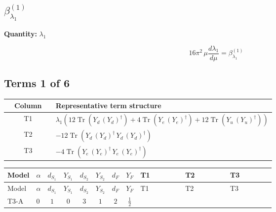\documentclass[8pt]{article}
\begin{document}
\begin{landscape}
\section*{$\beta_{\lambda_1}^{(1)}$}
\noindent\textbf{Quantity: }$\lambda_1$\par\smallskip
\[16\pi^2\,\mu\frac{d \lambda_1}{d\mu}=\beta_{\lambda_1}^{(1)}\]
\subsection*{Terms 1 of 6}
\begin{center}
\begin{tabular}{@{}c >{\raggedright\arraybackslash}p{0.82\linewidth}@{}}
\toprule
Column & Representative term structure \\
\midrule
T1 & \(\displaystyle {\lambda_1} (12 \operatorname{Tr}\!\left({Y_d}\,\left({Y_d}\right)^{\dagger}\right)+4 \operatorname{Tr}\!\left({Y_e}\,\left({Y_e}\right)^{\dagger}\right)+12 \operatorname{Tr}\!\left({Y_u}\,\left({Y_u}\right)^{\dagger}\right))\) \\
\midrule
T2 & \(\displaystyle -12 \operatorname{Tr}\!\left({Y_d}\,\left({Y_d}\right)^{\dagger}\,{Y_d}\,\left({Y_d}\right)^{\dagger}\right)\) \\
\midrule
T3 & \(\displaystyle -4 \operatorname{Tr}\!\left({Y_e}\,\left({Y_e}\right)^{\dagger}\,{Y_e}\,\left({Y_e}\right)^{\dagger}\right)\) \\
\midrule
\bottomrule
\end{tabular}
\end{center}
\smallskip
\tiny
\begin{longtable}{@{}llcccccc >{\raggedright\arraybackslash}p{0.21\linewidth} >{\raggedright\arraybackslash}p{0.21\linewidth} >{\raggedright\arraybackslash}p{0.21\linewidth}@{}}
\toprule
Model & $\alpha$ & $d_{S_1}$ & $Y_{S_1}$ & $d_{S_2}$ & $Y_{S_2}$ & $d_F$ & $Y_F$ & T1 & T2 & T3 \\
\midrule
\endfirsthead
\toprule
Model & $\alpha$ & $d_{S_1}$ & $Y_{S_1}$ & $d_{S_2}$ & $Y_{S_2}$ & $d_F$ & $Y_F$ & T1 & T2 & T3 \\
\midrule
\endhead
T3-A & $0$ & $1$ & $0$ & $3$ & $1$ & $2$ & $\frac{1}{2}$ & \scriptsize\adjustbox{max width=\linewidth}{$\begin{gathered} {\lambda_1} (12 \operatorname{Tr}\!\left({Y_d}\,\left({Y_d}\right)^{\dagger}\right)+4 \operatorname{Tr}\!\left({Y_e}\,\left({Y_e}\right)^{\dagger}\right)+12 \operatorname{Tr}\!\left({Y_u}\,\left({Y_u}\right)^{\dagger}\right))\end{gathered}$} & \scriptsize\adjustbox{max width=\linewidth}{$\begin{gathered} -12 \operatorname{Tr}\!\left({Y_d}\,\left({Y_d}\right)^{\dagger}\,{Y_d}\,\left({Y_d}\right)^{\dagger}\right)\end{gathered}$} & \scriptsize\adjustbox{max width=\linewidth}{$\begin{gathered} -4 \operatorname{Tr}\!\left({Y_e}\,\left({Y_e}\right)^{\dagger}\,{Y_e}\,\left({Y_e}\right)^{\dagger}\right)\end{gathered}$} \\

\end{longtable}
\end{landscape}
\end{document}
